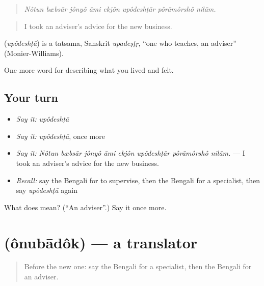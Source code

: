 \begin{quote}
\emph{Nôtun bæbsār jônyô āmi ekjôn upôdeshṭār pôrāmôrshô nilām.}
\end{quote}

\begin{quote}
I took an adviser's advice for the new business.
\end{quote}

\begin{cousinweb}
\textbf{} (\emph{upôdeshṭā}) is a tatsama, Sanskrit \emph{upadeṣṭṛ}, \textquotedblleft{}one who teaches, an adviser\textquotedblright{} (Monier-Williams).
\end{cousinweb}

\begin{grammarlens}[title={What you've built}]
One more word for describing what you lived and felt.
\end{grammarlens}

\subsection*{Your turn}
\begin{itemize}
\raggedright
  \item \emph{Say it:} \emph{upôdeshṭā}
  \item \emph{Say it:} \emph{upôdeshṭā}, once more
  \item \emph{Say it:} \emph{Nôtun bæbsār jônyô āmi ekjôn upôdeshṭār pôrāmôrshô nilām.} — I took an adviser's advice for the new business.
  \item \emph{Recall:} say the Bengali for to supervise, then the Bengali for a specialist, then say \emph{upôdeshṭā} again
\end{itemize}

\begin{tcolorbox}[breakable,colback=teal!4,colframe=teal!35!black,title={Before you move on}]
What does  mean? (\textquotedblleft{}An adviser\textquotedblright{}.) Say it once more.
\end{tcolorbox}
\section[\texorpdfstring{\bn{অনুবাদক} (ônubādôk)}{অনুবাদক (ônubādôk)}]{ (ônubādôk) — a translator}

\label{lesson:BN-C501-onubadok}



\begin{quote}
Before the new one: say the Bengali for a specialist, then the Bengali for an adviser.
\end{quote}

